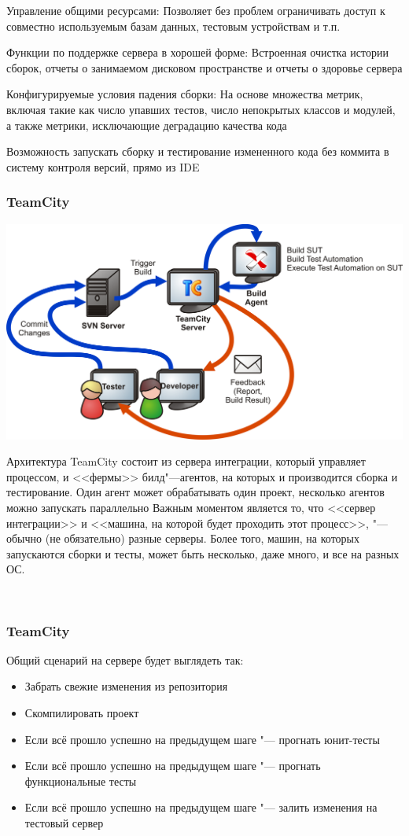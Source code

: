 \documentclass{../industrial-development}
\begin{document}
Управление общими ресурсами:
Позволяет без проблем ограничивать доступ к совместно используемым базам данных, тестовым устройствам и т.п.

Функции по поддержке сервера в хорошей форме:
Встроенная очистка истории сборок, отчеты о занимаемом дисковом пространстве и отчеты о здоровье сервера

Конфигурируемые условия падения сборки:
На основе множества метрик, включая такие как число упавших тестов, число непокрытых классов и модулей, а также метрики, исключающие деградацию качества кода

Возможность запускать сборку и тестирование измененного кода без коммита в систему контроля версий, прямо из IDE


\begin{frame} \frametitle{TeamCity}
	\includegraphics[width=\textwidth]{teamcity2}
\end{frame}
\lecturenotes
Архитектура TeamCity состоит из сервера интеграции, который управляет процессом, и <<фермы>> билд"---агентов, на которых и производится сборка и тестирование. Один агент может обрабатывать один проект, несколько агентов можно запускать параллельно
Важным моментом является то, что <<сервер интеграции>> и <<машина, на которой будет проходить этот процесс>>, "--- обычно (не обязательно) разные серверы. Более того, машин, на которых запускаются сборки и тесты, может быть несколько, даже много, и все на разных ОС.

~\cite{Habr_Team_City}

\begin{frame} \frametitle{TeamCity}
	\begin{block}{Общий сценарий на сервере будет выглядеть так:}
		\begin{itemize}
			\item Забрать свежие изменения из репозитория
			\item Скомпилировать проект
			\item Если всё прошло успешно на предыдущем шаге "--- прогнать юнит-тесты
			\item Если всё прошло успешно на предыдущем шаге "--- прогнать функциональные тесты
			\item Если всё прошло успешно на предыдущем шаге "--- залить изменения на тестовый сервер
		\end{itemize}
	\end{block}
\end{frame}
\end{document}
